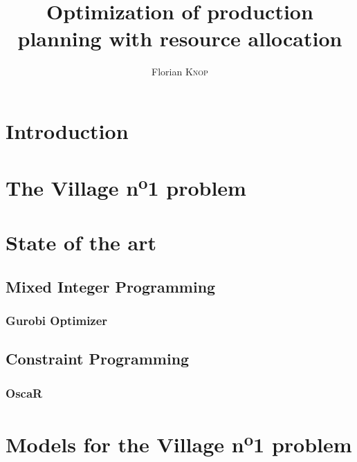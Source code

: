 \documentclass{template/EPL-master-thesis-covers-EN}
\title{Optimization of production planning with resource allocation}
\author{Florian \textsc{Knop}}
\begin{document}
  
  \maketitle

  \tableofcontents

  \chapter{Introduction}
  

  \chapter{The Village n\textsuperscript{o}1 problem}
  


  \chapter{State of the art}


  \section{Mixed Integer Programming}

  
  \subsection{Gurobi Optimizer}
  
  

  \section{Constraint Programming}

  

  \subsection{OscaR}

  

  
  \chapter{Models for the Village n\textsuperscript{o}1 problem}
\end{document}
